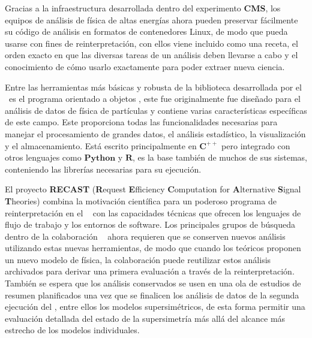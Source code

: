 
Gracias a la infraestructura desarrollada dentro del experimento \textbf{CMS}, los equipos de análisis de física de altas energías ahora pueden preservar fácilmente su código de análisis en formatos de contenedores Linux, de modo que pueda usarse con fines de reinterpretación, con ellos viene incluido como una receta, el orden exacto en que las diversas tareas de un análisis deben llevarse a cabo y el conocimiento de cómo usarlo exactamente para poder extraer nueva ciencia.

Entre las herramientas más básicas y robusta de la biblioteca desarrollada por el \CERN ~es el programa orientado a objetos \ROOT, este fue originalmente fue diseñado para el análisis de datos de física de partículas y contiene varias características específicas de este campo. Este proporciona todas las funcionalidades necesarias para manejar el procesamiento de grandes datos, el análisis estadístico, la visualización y el almacenamiento. Está escrito principalmente en $\mathbf{C^{++}}$ pero integrado con otros lenguajes como $\mathbf{Python}$ y $\mathbf{R}$, es la base también de muchos de sus sistemas, conteniendo las librerías necesarias para su ejecución.

El proyecto \textbf{RECAST} (\textbf{R}equest \textbf{E}fficiency \textbf{C}omputation for \textbf{A}lternative \textbf{S}ignal \textbf{T}heo\-ries) combina la motivación científica para un poderoso programa de reinterpretación en el \LHC ~ con las capacidades técnicas que ofrecen los lenguajes de flujo de trabajo y los entornos de software. Los principales grupos de búsqueda dentro de la colaboración \LHC~ ahora requieren que se conserven nuevos análisis utilizando estas nuevas herramientas, de modo que cuando los teóricos proponen un nuevo modelo de física, la colaboración puede reutilizar estos análisis archivados para derivar una primera evaluación a través de la reinterpretación. También se espera que los análisis conservados se usen en una ola de estudios de resumen planificados una vez que se finalicen los análisis de datos de la segunda ejecución del \LHC, entre ellos los modelos supersimétricos, %
de esta forma permitir una evaluación detallada del estado de la supersimetría más allá del alcance más estrecho de los modelos individuales. 



